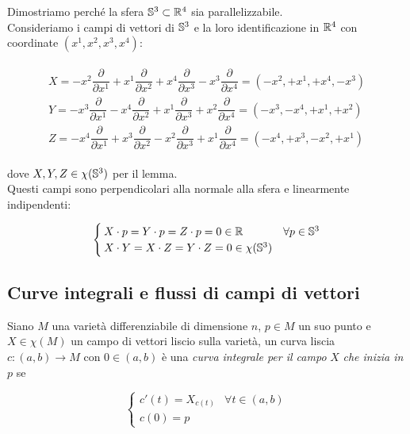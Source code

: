 Dimostriamo perché la sfera $ \S^{3} \subset \R^{4} $ sia parallelizzabile.\\
Consideriamo i campi di vettori di $ \S^{3} $ e la loro identificazione in $ \R^{4} $ con coordinate $ (x^{1},x^{2},x^{3},x^{4}) $:

\begin{align}
	\begin{split}
		X = - x^{2} \dfrac{\partial}{\partial x^{1}} + x^{1} \dfrac{\partial}{\partial x^{2}} + x^{4} \dfrac{\partial}{\partial x^{3}} - x^{3} \dfrac{\partial}{\partial x^{4}} = (-x^{2}, +x^{1}, +x^{4}, -x^{3})\\
		Y = - x^{3} \dfrac{\partial}{\partial x^{1}} - x^{4} \dfrac{\partial}{\partial x^{2}} + x^{1} \dfrac{\partial}{\partial x^{3}} + x^{2} \dfrac{\partial}{\partial x^{4}} = (-x^{3}, -x^{4}, +x^{1}, +x^{2})\\
		Z = - x^{4} \dfrac{\partial}{\partial x^{1}} + x^{3} \dfrac{\partial}{\partial x^{2}} - x^{2} \dfrac{\partial}{\partial x^{3}} + x^{1} \dfrac{\partial}{\partial x^{4}} = (-x^{4}, +x^{3}, -x^{2}, +x^{1})
	\end{split}
\end{align}

dove $ X,Y,Z \in \chi(\S^{3}) $ per il lemma.\\
Questi campi sono perpendicolari alla normale alla sfera e linearmente indipendenti:

\begin{equation}
	\begin{cases}
		X \cdot p = Y \cdot p = Z \cdot p = 0 \in \R & \forall p \in \S^{3}\\
		X \cdot Y = X \cdot Z = Y \cdot Z = 0 \in \chi(\S^{3})
	\end{cases}
\end{equation}

\subsection{Curve integrali e flussi di campi di vettori}

Siano $ M $ una varietà differenziabile di dimensione $ n $, $ p \in M $ un suo punto e $ X \in \chi(M) $ un campo di vettori liscio sulla varietà, un curva liscia $ c : (a,b) \to M $ con $ 0 \in (a,b) $ è una \textit{curva integrale per il campo} $ X $ \textit{che inizia in} $ p $ se

\begin{equation}
	\begin{cases}
		c'(t) = X_{c(t)} & \forall t \in (a,b)\\
		c(0) = p
	\end{cases}
\end{equation}


